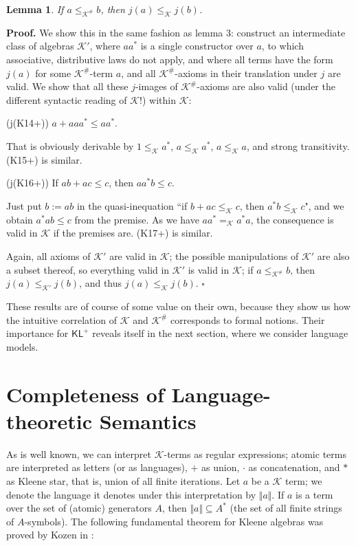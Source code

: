 \documentclass{eptcs}
\newtheorem{lem}[defn]{Lemma}
\newcommand{\proofbeg}{\textbf{Proof. }}
\newcommand{\proofend}{\hfill $\square$}
\newcommand{\KA}{\mathcal{K}}
\newcommand{\KL}{\mathsf{KL}}
\begin{document}
\begin{lem}
If $a\leq_{\KA^\#}b$, then $j(a)\leq_\KA j(b)$.
\end{lem}

\proofbeg
We show this in the same fashion as lemma 3: construct an
intermediate class of algebras $\KA'$, where $aa^*$ is a single constructor over
$a$, to which associative, distributive laws do not apply, and
where all terms
have the form $j(a)$ for some $\KA^\#$-term $a$, and all $\KA^\#$-axioms 
in their translation under $j$
are valid. We show that all these $j$-images of $\KA^\#$-axioms 
are also valid (under the different syntactic reading
of $\KA$!) within $\KA$: 

(j(K14+)) $a+aaa^*\leq aa^*$. 

That is obviously derivable by $1\leq_\KA a^*$, $a\leq_\KA a^*$, $a\leq_\KA a$,
and strong transitivity.
(K15+) is similar. 

(j(K16+)) If $ab+ac\leq c$, then $aa^*b\leq c$. 

Just put $b:=ab$ in the quasi-inequation 
``if $b+ac\leq_\KA c$, then $a^*b\leq_\KA c$", and
we obtain $a^*ab\leq c$ from the premise. As we have 
$aa^*=_{\KA} a^*a$, the consequence is valid in $\KA$ if the
premises are.
(K17+) is similar.

Again, all axioms of $\KA'$
are valid in $\KA$; the possible manipulations of $\KA'$ are
also a subset thereof, so everything valid in $\KA'$ is valid in $\KA$;
if $a\leq_{\KA^\#}b$, then $j(a)\leq_{\KA'} j(b)$, and thus $j(a)\leq_\KA j(b)$.
\proofend

These results are of course of some value on their own, because they
show us how the intuitive correlation of $\KA$ and $\KA^\#$ corresponds 
to formal notions. Their importance for $\KL^+$ reveals itself in the
next section, where we consider language models.



\section{Completeness of Language-theoretic Semantics}

As is well known, we can interpret $\KA$-terms as regular
expressions; atomic terms are interpreted as letters (or as 
languages),
$+$ as union, $\cdot$ as concatenation, and $*$ as Kleene
star, that is, union of all finite iterations. Let $a$ be
a $\KA$ term; we denote the language it denotes under this
interpretation by $\Vert a\Vert$.
If $a$ is a term over the set of (atomic) generators $A$, 
then $\Vert a\Vert\subseteq A^*$ (the set of all finite strings of
$A$-symbols). The following 
fundamental theorem for Kleene algebras was proved by 
Kozen in \cite{kozen:completeness}:
\end{document}
